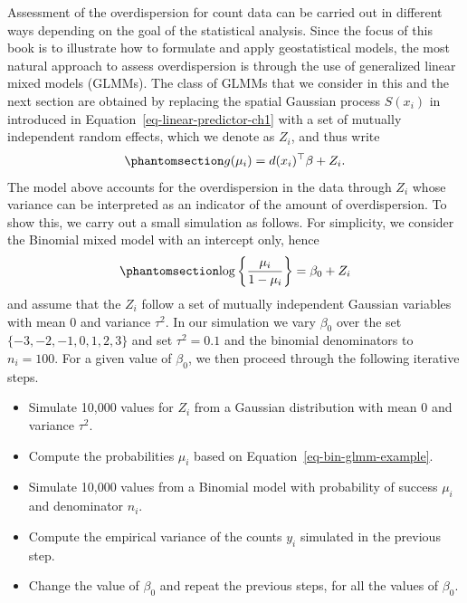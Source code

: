 \documentclass[
  letterpaper,
]{krantz}
\begin{document}
Assessment of the overdispersion for count data can be carried out in
different ways depending on the goal of the statistical analysis. Since
the focus of this book is to illustrate how to formulate and apply
geostatistical models, the most natural approach to assess
overdispersion is through the use of generalized linear mixed models
(GLMMs). The class of GLMMs that we consider in this and the next
section are obtained by replacing the spatial Gaussian process
\(S(x_i)\) in introduced in Equation~\ref{eq-linear-predictor-ch1} with
a set of mutually independent random effects, which we denote as
\(Z_i\), and thus write
\begin{equation}\phantomsection\label{eq-linear-predictor-glmms-ch2}{
g(\mu_i) = d(x_i)^\top \beta + Z_i.
}\end{equation} The model above accounts for the overdispersion in the
data through \(Z_i\) whose variance can be interpreted as an indicator
of the amount of overdispersion. To show this, we carry out a small
simulation as follows. For simplicity, we consider the Binomial mixed
model with an intercept only, hence
\begin{equation}\phantomsection\label{eq-bin-glmm-example}{
\log\left\{\frac{\mu_i}{1-\mu_i}\right\} = \beta_0 + Z_i
}\end{equation} and assume that the \(Z_i\) follow a set of mutually
independent Gaussian variables with mean 0 and variance \(\tau^2\). In
our simulation we vary \(\beta_0\) over the set
\(\{-3, -2, -1, 0, 1, 2, 3\}\) and set \(\tau^2=0.1\) and the binomial
denominators to \(n_i = 100\). For a given value of \(\beta_0\), we then
proceed through the following iterative steps.

\begin{itemize}
\item
  Simulate 10,000 values for \(Z_i\) from a Gaussian distribution with
  mean 0 and variance \(\tau^2\).
\item
  Compute the probabilities \(\mu_i\) based on
  Equation~\ref{eq-bin-glmm-example}.
\item
  Simulate 10,000 values from a Binomial model with probability of
  success \(\mu_i\) and denominator \(n_i\).
\item
  Compute the empirical variance of the counts \(y_i\) simulated in the
  previous step.
\item
  Change the value of \(\beta_0\) and repeat the previous steps, for all
  the values of \(\beta_0\).
\end{itemize}
\end{document}
